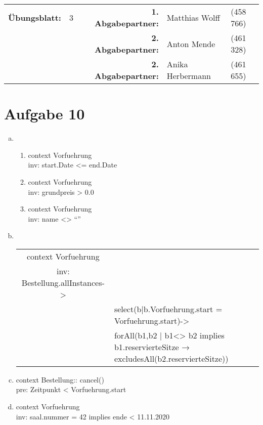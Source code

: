 \newcommand{\obenlinks}{Software Engineering}		%

\usepackage{float}


	\begin{center}
		\begin{tabular}{|rlp{4cm}rll|}
		\hline
		 \textbf{Übungsblatt:} & 3 &   & \textbf{1. Abgabepartner:} & Matthias Wolff & (458 766)  \\
		        & & & \textbf{2. Abgabepartner:} & Anton Mende & (461 328) \\
		        & & & \textbf{2. Abgabepartner:} & Anika Herbermann & (461 655) \\ \hline
		\end{tabular}
	\end{center}
\section*{Aufgabe 10}
\begin{enumerate} [a)]
	\item \begin{enumerate} [1.]
		\item context Vorfuehrung \\
		inv: start.Date <= end.Date
		\item context Vorfuehrung\\
		inv: grundpreis > 0.0
		\item context Vorfuehrung \\
		inv: name <> “”
	\end{enumerate}
\item \phantom{a}\\
\begin{tabular}{cl}
	context Vorfuehrung&\\
	inv: Bestellung.allInstances->&\\
	&select(b|b.Vorfuehrung.start = Vorfuehrung.start)->\\
	&forAll(b1,b2 | b1<> b2 implies b1.reservierteSitze → excludesAll(b2.reservierteSitze))\\
\end{tabular}
\item context Bestellung:: cancel()\\
pre: Zeitpunkt < Vorfuehrung.start
\item context Vorfuehrung \\
inv: saal.nummer = 42 implies ende < 11.11.2020
\end{enumerate}

